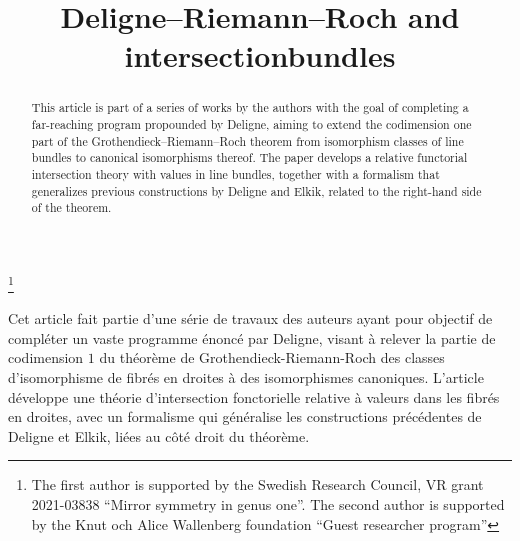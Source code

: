 \documentclass[JEP,XML,SOM,Unicode,published]{cedram}
\theoremstyle{plain}
\theoremstyle{definition}
\begin{document}
\frontmatter
\title{Deligne--Riemann--Roch and intersection\nobreakspace bundles}

\author[\initial{D.} \lastname{Eriksson}]{ }
\address{Department of Mathematics, Chalmers University of Technology and University of Gothenburg,\\
412 96 Göteborg, Sweden}

\author[\initial{G.} \lastname{Freixas i Montplet}]{ }
\address{C.N.R.S., Centre de Mathématiques Laurent Schwartz, École Polytechnique, Institut Polytechnique de Paris,\\
91128 Palaiseau cedex, France}

\thanks{The first author is supported by the Swedish Research Council, VR grant 2021-03838 ``Mirror symmetry in genus one''. The second author is supported by the Knut och Alice Wallenberg foundation ``Guest researcher program''}

\begin{abstract}
This article is part of a series of works by the authors with the goal of completing a far-reaching program propounded by Deligne, aiming to extend the codimension one part of the Grothendieck--Riemann--Roch theorem from isomorphism classes of line bundles to canonical isomorphisms thereof. The paper develops a relative functorial intersection theory with values in line bundles, together with a formalism that generalizes previous constructions by Deligne and Elkik, related to the right-hand side of the theorem.
\end{abstract}





\begin{altabstract}
Cet article fait partie d'une série de travaux des auteurs ayant pour objectif de compléter un vaste programme énoncé par Deligne, visant à relever la partie de codimension $1$ du théorème de Grothendieck-Riemann-Roch des classes d'isomorphisme de fibrés en droites à des isomorphismes canoniques. L'article développe une théorie d'intersection fonctorielle relative à valeurs dans les fibrés en droites, avec un formalisme qui généralise les constructions précédentes de Deligne et Elkik, liées au côté droit du théorème.
\end{altabstract}
\maketitle
\end{document}
